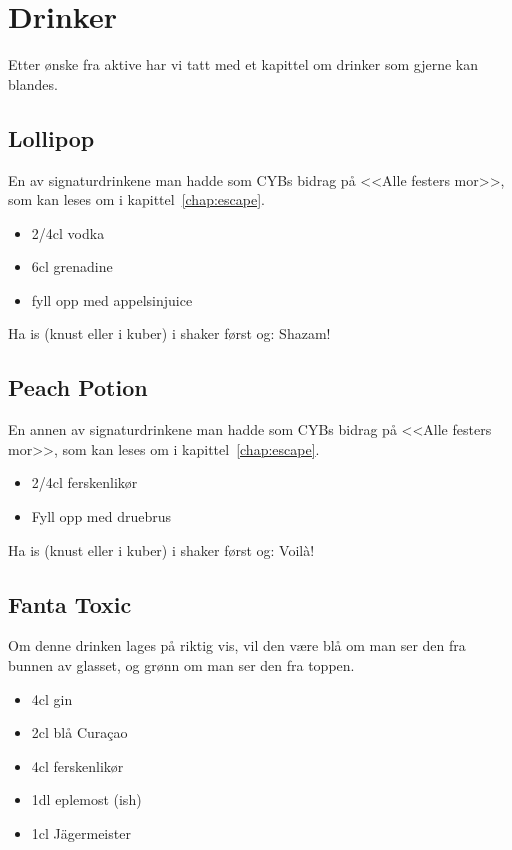 \chapter*{Drinker}

Etter ønske fra aktive har vi tatt med et kapittel om drinker som gjerne kan blandes.

\section*{Lollipop}

En av signaturdrinkene man hadde som CYBs bidrag på <<Alle festers mor>>, som kan leses om i kapittel~\ref{chap:escape}.

\begin{itemize}
	\item 2/4cl vodka
	\item 6cl grenadine
	\item fyll opp med appelsinjuice
\end{itemize}

Ha is (knust eller i kuber) i shaker først og: Shazam!

\section*{Peach Potion}

En annen av signaturdrinkene man hadde som CYBs bidrag på <<Alle festers mor>>, som kan leses om i kapittel~\ref{chap:escape}.

\begin{itemize}
	\item 2/4cl ferskenlikør
	\item Fyll opp med druebrus
\end{itemize}

Ha is (knust eller i kuber) i shaker først og: Voilà!

\section*{Fanta Toxic}

Om denne drinken lages på riktig vis, vil den være blå om man ser den fra bunnen av glasset, og grønn om man ser den fra toppen.

\begin{itemize}
	\item 4cl gin
	\item 2cl blå Curaçao
	\item 4cl ferskenlikør
	\item 1dl eplemost (ish)
	\item 1cl Jägermeister
\end{itemize}

